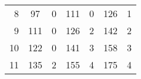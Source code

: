 \documentclass[authoryear]{tex/labreport}
\begin{document}
\begin{table}[htb]
\begin{tabular}{rcccccc}
    8                                & 97                          & 0                                                              & 111                                                                                                   & 0                                                                                         & 126                                                                                                      & 1                                                                                                                                                                                               \\
    9                                & 111                         & 0                                                              & 126                                                                                                   & 2                                                                                         & 142                                                                                                      & 2                                                                                                                                                                                               \\
    10                               & 122                         & 0                                                              & 141                                                                                                   & 3                                                                                         & 158                                                                                                      & 3                                                                                                                                                                                              \\
    11                               & 135                         & 2                                                              & 155                                                                                                   & 4                                                                                         & 175                                                                                                      & 4                                                                                                                                                                                               \\

\end{tabular}
\end{table}
\end{document}
